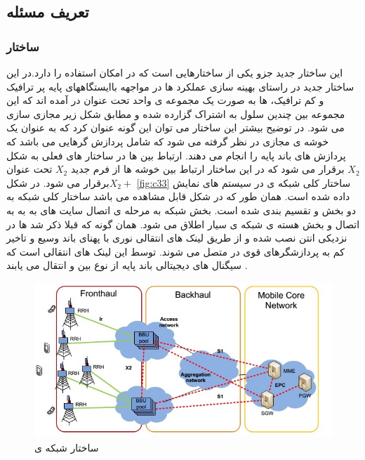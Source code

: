 \subsection{تعریف مسئله}
\subsubsection{ساختار }
این ساختار جدید جزو یکی از ساختارهایی است که در  امکان استفاده را دارد.در این ساختار جدید در راستای بهینه سازی عملکرد 
 ها در مواجهه باایستگاههای پایه پر ترافیک و کم ترافیک،
 ها به صورت یک مجموعه ی واحد تحت عنوان 
 در آمده اند که این مجموعه بین چندین سلول 
 به اشتراک گزارده شده و مطابق شکل زیر مجازی سازی
می شود. 
در توضیح بیشتر این ساختار می توان این گونه
عنوان کرد که  به عنوان یک خوشه ی مجازی
در نظر گرفته می شود که شامل پردازش گرهایی می باشد
که پردازش های باند پایه را انجام می دهند. ارتباط بین
  ها در ساختار های فعلی به شکل  $X_2$ برقرار می شود
که در این ساختار ارتباط بین خوشه ها از فرم جدید $X_2$
تحت عنوان  $X_2 +$برقرار می شود.
\newline
در شکل \ref{fig:c33} ساختار کلی شبکه ی   در سیستم های
 نمایش داده شده است. همان طور که در شکل قابل
مشاهده می باشد ساختار کلی شبکه   به دو بخش
  و  تقسیم بندی شده است. بخش
 شبکه به مرحله ی اتصال سایت های به
 به  به اتصال  و بخش 
هسته ی شبکه ی سیار اطلاق می شود. همان گونه که قبلا
ذکر شد  ها در نزدیکی انتن نصب شده و از طریق
لینک های انتقالی نوری با پهنای باند وسیع و تاخیر کم به
پردازشگرهای قوی در  متصل می شوند. توسط این
لینک های انتقالی است که سیگنال های دیجیتالی باند
پایه از نوع  بین  و  انتقال می یابند \cite{checko2015cloud}.
\begin{figure}[H]
  \centering
    \includegraphics[width=\textwidth]{CRAN}
  \caption{ساختار شبکه ی  \cite{checko2015cloud}}
  \label{fig:C-RAN}
\end{figure}
